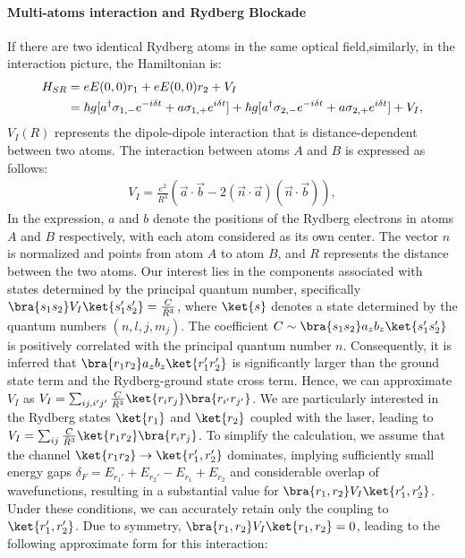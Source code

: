 \documentclass[11pt]{article}
\begin{document}
 \paragraph{Multi-atoms interaction and Rydberg Blockade}
If there are two identical Rydberg atoms in the same optical field,similarly, in the interaction picture, the Hamiltonian is:
\begin{align}
    H_{SR}  &=e E(0,0) r_1 + e E(0,0) r_2 + V_I \notag \\
    &=\hbar  g [a^\dagger \sigma_{1,-}e^{-i\delta t}  + a \sigma_{1,+}e^{i\delta t} ] + \hbar  g [a^\dagger \sigma_{2,-}e^{-i\delta t}  + a \sigma_{2,+} e^{i\delta t}] + V_I,\label{qeleHam}
\end{align}
$V_I(R)$ represents the dipole-dipole interaction that is distance-dependent between two atoms. The interaction between atoms $A$ and $B$ is expressed as follows:
\begin{align}
    V_I = \frac{e^2}{R^3} (\Vec{a}\cdot \Vec{b} - 2(\Vec{n}\cdot \Vec{a})(\Vec{n}\cdot \Vec{b}) ),
\end{align}
In the expression, $a$ and $b$ denote the positions of the Rydberg electrons in atoms $A$ and $B$ respectively, with each atom considered as its own center. The vector $n$ is normalized and points from atom $A$ to atom $B$, and $R$ represents the distance between the two atoms. Our interest lies in the components associated with states determined by the principal quantum number, specifically $\bra{s_1s_2}V_I\ket{s_1's_2'} = \frac{C}{\bar{R}^3}$, where $\ket{s}$ denotes a state determined by the quantum numbers $(n, l, j, m_j)$. The coefficient $C \sim \bra{s_1 s_2} a_zb_z \ket{s_1' s_2'}$ is positively correlated with the principal quantum number $n$. Consequently, it is inferred that $\bra{r_1 r_2} a_zb_z \ket{r_1' r_2'}$ is significantly larger than the ground state term and the Rydberg-ground state cross term. Hence, we can approximate $V_I$ as $V_I = \sum_{ij, i'j'} \frac{C}{\bar{R}^3} \ket{r_i r_j}\bra{r_{i'} r_{j'}}$. We are particularly interested in the Rydberg states $\ket{r_1}$ and $\ket{r_2}$ coupled with the laser, leading to $V_I = \sum_{ij} \frac{C}{\bar{R}^3} \ket{r_1 r_2}\bra{r_i r_j}$. To simplify the calculation, we assume that the channel $\ket{r_1 r_2} \to \ket{r_1', r_2'}$ dominates, implying sufficiently small energy gaps $\delta_F = E_{r_1'} + E_{r_2'} - E_{r_1} + E_{r_2}$ and considerable overlap of wavefunctions, resulting in a substantial value for $\bra{r_1,r_2} V_I \ket{r_1',r_2'}$. Under these conditions, we can accurately retain only the coupling to $\ket{r_1',r_2'}$. Due to symmetry, $\bra{r_1,r_2} V_I \ket{r_1,r_2} = 0$, leading to the following approximate form for this interaction:
\end{document}
